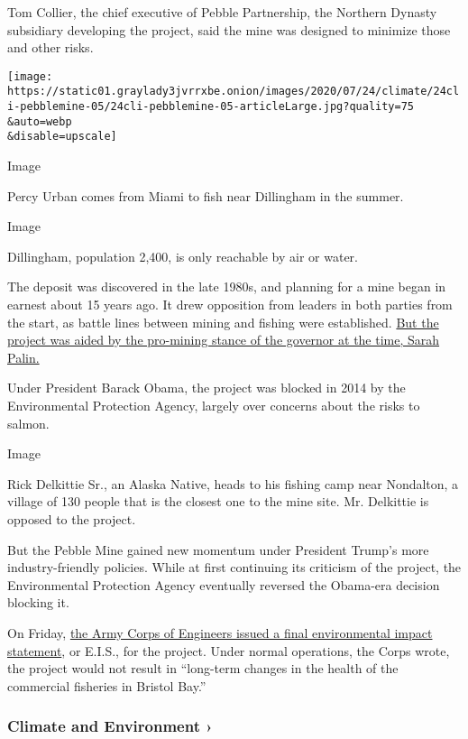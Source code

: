 Tom Collier, the chief executive of Pebble Partnership, the Northern
Dynasty subsidiary developing the project, said the mine was designed to
minimize those and other risks.

\texttt{[image: https://static01.graylady3jvrrxbe.onion/images/2020/07/24/climate/24cli-pebblemine-05/24cli-pebblemine-05-articleLarge.jpg?quality=75\\\&auto=webp\\\&disable=upscale]}

Image

Percy Urban comes from Miami to fish near Dillingham in the summer.

Image

Dillingham, population 2,400, is only reachable by air or water.

The deposit was discovered in the late 1980s, and planning for a mine
began in earnest about 15 years ago. It drew opposition from leaders in
both parties from the start, as battle lines between mining and fishing
were established.
\href{https://www.nytimes3xbfgragh.onion/2008/10/22/us/politics/22mining.html}{But
the project was aided by the pro-mining stance of the governor at the
time, Sarah Palin.}

Under President Barack Obama, the project was blocked in 2014 by the
Environmental Protection Agency, largely over concerns about the risks
to salmon.

Image

Rick Delkittie Sr., an Alaska Native, heads to his fishing camp near
Nondalton, a village of 130 people that is the closest one to the mine
site. Mr. Delkittie is opposed to the project.

But the Pebble Mine gained new momentum under President Trump's more
industry-friendly policies. While at first continuing its criticism of
the project, the Environmental Protection Agency eventually reversed the
Obama-era decision blocking it.

On Friday, \href{https://pebbleprojecteis.com/documents/finaleis}{the
Army Corps of Engineers issued a final environmental impact statement},
or E.I.S., for the project. Under normal operations, the Corps wrote,
the project would not result in ``long-term changes in the health of the
commercial fisheries in Bristol Bay.''

\href{https://www.nytimes3xbfgragh.onion/section/climate?action=click\&pgtype=Article\&state=default\&region=MAIN_CONTENT_1\&context=storylines_keepup}{}

\hypertarget{climate-and-environment-}{%
\subsubsection{Climate and Environment
›}\label{climate-and-environment-}}

